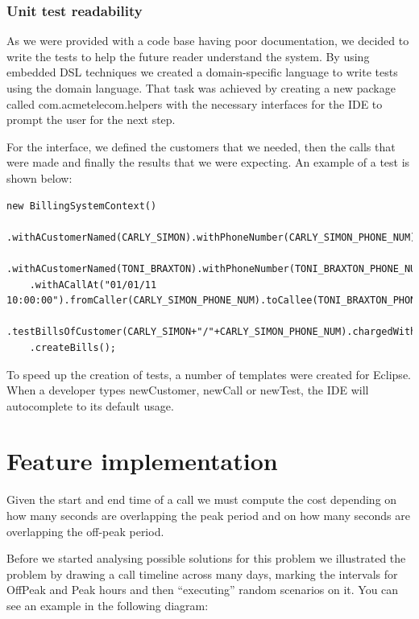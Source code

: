 \documentclass[pdftex,11pt,a4paper]{article}
\begin{document}
\subsubsection{Unit test readability}
As we were provided with a code base having poor documentation, we decided to write the tests to help the future reader understand the system. By using embedded DSL techniques we created a domain-specific language to write tests using the domain language. That task was achieved by creating a new package called com.acmetelecom.helpers with the necessary interfaces for the IDE to prompt the user for the next step.

For the interface, we defined the customers that we needed, then the calls that were made and finally the results that we were expecting. An example of a test is shown below: 

\begin{lstlisting}
new BillingSystemContext()
	.withACustomerNamed(CARLY_SIMON).withPhoneNumber(CARLY_SIMON_PHONE_NUM).andPricePlan(STANDARD_TARIFF)
	.withACustomerNamed(TONI_BRAXTON).withPhoneNumber(TONI_BRAXTON_PHONE_NUM).andPricePlan(BUSINESS_TARIFF)
	.withACallAt("01/01/11 10:00:00").fromCaller(CARLY_SIMON_PHONE_NUM).toCallee(TONI_BRAXTON_PHONE_NUM).thatLastsForSecond(60)
	.testBillsOfCustomer(CARLY_SIMON+"/"+CARLY_SIMON_PHONE_NUM).chargedWithPricePlan(STANDARD_TARIFF).forPeakSeconds(60).andOffPeakSeconds(0)
	.createBills();
\end{lstlisting}

To speed up the creation of tests, a number of templates were created for Eclipse. When a developer types newCustomer, newCall or newTest, the IDE will autocomplete to its default usage.

\section{Feature implementation}
Given the start and end time of a call we must compute the cost depending on how many seconds are overlapping the peak period and on how many seconds are overlapping the off-peak period. 

Before we started analysing possible solutions for this problem we illustrated the problem by drawing a call timeline across many days, marking the intervals for OffPeak and Peak hours and then “executing” random scenarios on it. You can see an example in the following diagram:
\end{document}
